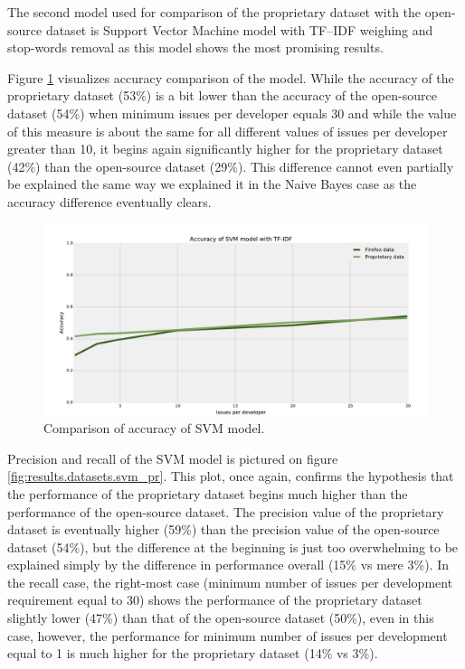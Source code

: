 The second model used for comparison of the proprietary dataset with the open-source dataset is Support Vector Machine model with TF--IDF weighing and stop-words removal as this model shows the most promising results.

Figure \ref{fig:results.datasets.svm_accuracy} visualizes accuracy comparison of the model. While the accuracy of the proprietary dataset (53\%) is a bit lower than the accuracy of the open-source dataset (54\%) when minimum issues per developer equals 30 and while the value of this measure is about the same for all different values of issues per developer greater than 10, it begins again significantly higher for the proprietary dataset (42\%) than the open-source dataset (29\%). This difference cannot even partially be explained the same way we explained it in the Naive Bayes case as the accuracy difference eventually clears.

\begin{figure}[htbp]
    \centering
        \includegraphics[width=\textwidth]{./images/prop_vs_os/svm_accuracy.pdf}
    \caption{Comparison of accuracy of SVM model.}
    \label{fig:results.datasets.svm_accuracy}
\end{figure}

Precision and recall of the SVM model is pictured on figure \ref{fig:results.datasets.svm_pr}. This plot, once again, confirms the hypothesis that the performance of the proprietary dataset begins much higher than the performance of the open-source dataset. The precision value of the proprietary dataset is eventually higher (59\%) than the precision value of the open-source dataset (54\%), but the difference at the beginning is just too overwhelming to be explained simply by the difference in performance overall (15\% vs mere 3\%). In the recall case, the right-most case (minimum number of issues per development requirement equal to 30) shows the performance of the proprietary dataset slightly lower (47\%) than that of the open-source dataset (50\%), even in this case, however, the performance for minimum number of issues per development equal to 1 is much higher for the proprietary dataset (14\% vs 3\%).

